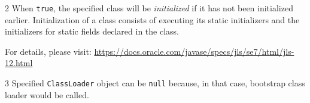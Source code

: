 \documentclass[sigconf]{acmart}
\begin{document}
\begin{table*}
\begin{threeparttable}[b]
\begin{tablenotes}
\item[2] When \texttt{true}, the specified class will be \textit{initialized} if it has not been initialized earlier. Initialization of a class consists of executing its static initializers and the initializers for static fields  declared in the class. 

For details, please visit: \url{https://docs.oracle.com/javase/specs/jls/se7/html/jls-12.html}

\item[3] Specified \texttt{ClassLoader} object can be \texttt{null} because, in that case, bootstrap class loader would be called.


   \end{tablenotes}
  \end{threeparttable}
\end{table*}
\end{document}
